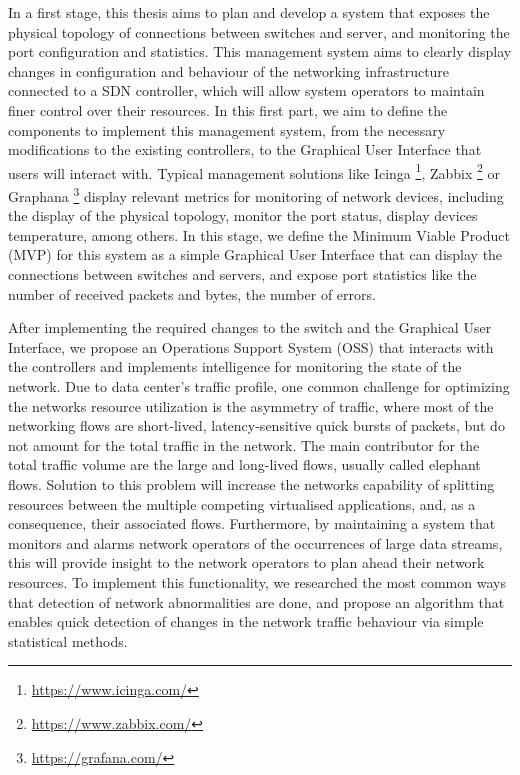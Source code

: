 In a first stage, this thesis aims to plan and develop a system that exposes the physical topology of connections between switches and server, and monitoring
the port configuration and statistics. This management system aims to clearly display changes in configuration and behaviour of the networking infrastructure
connected to a SDN controller, which will allow system operators to maintain finer control over their resources. In this first part, we aim to define the 
components to implement this management system, from the necessary modifications to the existing controllers, to the Graphical User Interface that users will 
interact with. Typical management solutions like Icinga \footnote{\url{https://www.icinga.com/}}, Zabbix \footnote{\url{https://www.zabbix.com/}} or
Graphana \footnote{\url{https://grafana.com/}} display relevant metrics for monitoring of network devices, including the display of the
physical topology, monitor the port status, display devices temperature, among others. In this stage, we define the Minimum Viable Product (MVP) for this system as a
simple Graphical User Interface that can display the connections between switches and servers, and expose port statistics like the number of received packets
and bytes, the number of errors.

\par After implementing the required changes to the switch and the Graphical User Interface, we propose an Operations Support System (OSS) that interacts with the
controllers and implements intelligence for monitoring the state of the network. Due to data center's traffic profile, one common challenge for optimizing the
networks resource utilization is the asymmetry of traffic, where most of the networking flows are short-lived, latency-sensitive quick bursts of packets, but do not
amount for the total traffic in the network. The main contributor for the total traffic volume are the large and long-lived flows, usually called elephant flows.
Solution to this problem will increase the networks capability of splitting resources between the multiple competing virtualised applications, and, as a consequence,
their associated flows. Furthermore, by maintaining a system that monitors and alarms network operators of the occurrences of large data streams, this will provide
insight to the network operators to plan ahead their network resources. To implement this functionality, we researched the most common ways that detection of network
abnormalities are done, and propose an algorithm that enables quick detection of changes in the network traffic behaviour via simple statistical methods.

